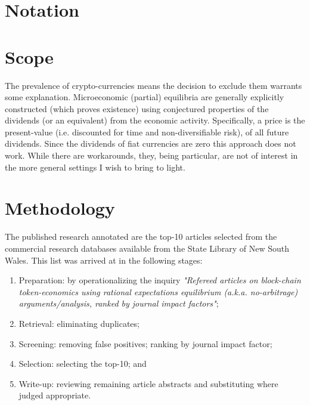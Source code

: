 \documentclass[11pt]{article}
\begin{document}
\section{Notation}

\begin{refsection}
\nocite{*}
\printbibliography[heading=bibnumbered]
\end{refsection}

\appendix

\section{Scope}
The prevalence of crypto-currencies means the decision to exclude them warrants some explanation. Microeconomic (partial) equilibria are generally explicitly constructed (which proves existence) using conjectured properties of the dividends (or an equivalent) from the economic activity. Specifically, a price is the present-value (i.e. discounted for time and non-diversifiable risk), of all future dividends. Since the dividends of fiat currencies are zero this approach does not work. While there are workarounds, they, being particular, are not of interest in the more general settings I wish to bring to light.

\section{Methodology}
The published research annotated are the top-10 articles selected from the commercial research databases available from the State Library of New South Wales. This list was arrived at in the following stages:
\begin{enumerate}
    \item Preparation:
    by operationalizing the inquiry \textit{"Refereed articles on block-chain token-economics using rational expectations equilibrium (a.k.a. no-arbitrage) arguments/analysis, ranked by journal impact factors"};
    \item Retrieval:
    eliminating duplicates;
    \item Screening:
    removing false positives;
    ranking by journal impact factor;
    \item Selection:
    selecting the top-10; and
    \item Write-up:
    reviewing remaining article abstracts and substituting where judged appropriate.
\end{enumerate}
\end{document}
